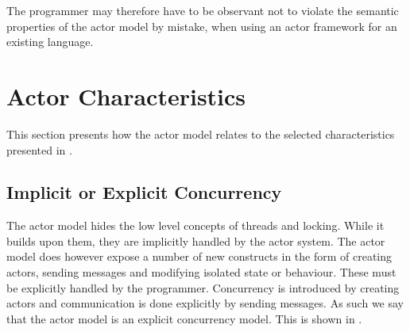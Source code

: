 The programmer may therefore have to be observant not to violate the semantic properties of the actor model by mistake, when using an actor framework for an existing language.




\section{Actor Characteristics}\label{sec:actor_charac}
This section presents how the actor model relates to the selected characteristics presented in .

\subsection{Implicit or Explicit Concurrency}
The actor model hides the low level concepts of threads and locking. While it builds upon them, they are implicitly handled by the actor system. The actor model does however expose a number of new constructs in the form of creating actors, sending messages and modifying isolated state or behaviour. These must be explicitly handled by the programmer. Concurrency is introduced by creating actors and communication is done explicitly by sending messages. As such we say that the actor model is an explicit concurrency model. This is shown in .

